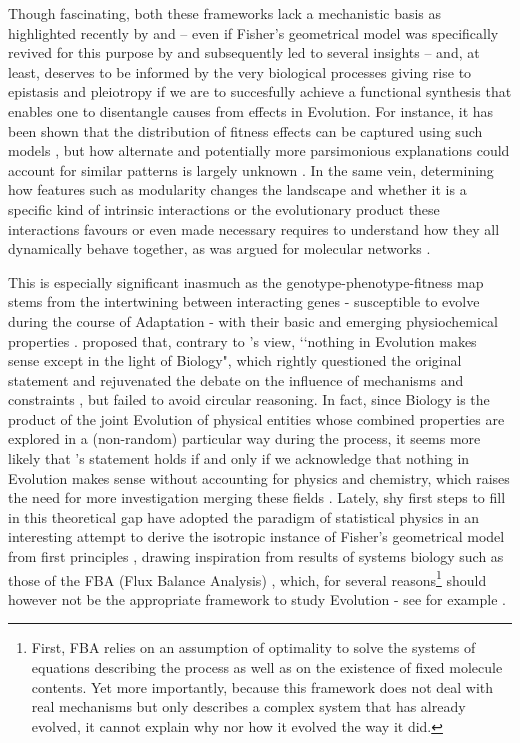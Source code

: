 \documentclass[11pt,onecolumn]{article}
\begin{document}
Though fascinating, both these frameworks lack a mechanistic basis as highlighted recently by \citet{Martin14} and \citet{Yi19} -- even if Fisher's geometrical model was specifically revived for this purpose by \citet{Hartl96} and subsequently led to several insights \citep{Martin06,Martin07} -- and, at least, deserves to be informed by the very biological processes giving rise to epistasis and pleiotropy if we are to succesfully achieve a functional synthesis \citep{Dean07} that enables one to disentangle causes from effects in Evolution. For instance, it has been shown that the distribution of fitness effects can be captured using such models \citep{Martin06,Huber17}, but how alternate and potentially more parsimonious explanations could account for similar patterns is largely unknown \citep{Lourenco11}. In the same vein, determining how features such as modularity \citep{Wagner07,Segre05,Hartwell99} changes the landscape and whether it is a specific kind of intrinsic interactions or the evolutionary product these interactions favours or even made necessary requires to understand how they all dynamically behave together, as was argued for molecular networks \citep{Alexander09}.

This is especially significant inasmuch as the genotype-phenotype-fitness map stems from the intertwining between interacting genes - susceptible to evolve \citep{Gros09} during the course of Adaptation - with their basic and emerging physiochemical properties \citep{Bershtein17}. \citet{Yi19} proposed that, contrary to \citet{Dobzhansky73}'s view, ‘‘nothing in Evolution makes sense except in the light of Biology", which rightly questioned the original statement and rejuvenated the debate on the influence of mechanisms and constraints \citep{Gould79}, but failed to avoid circular reasoning. In fact, since Biology is the product of the joint Evolution of physical entities whose combined properties are explored in a (non-random) particular way \citep{Monod71,Monod74,Wagner12} during the process, it seems more likely that \citet{Dobzhansky73}'s statement holds if and only if we acknowledge that nothing in Evolution makes sense without accounting for physics and chemistry, which raises the need for more investigation merging these fields \citep{Dean07,Serohijos14}. Lately, shy first steps to fill in this theoretical gap have adopted the paradigm of statistical physics in an interesting attempt to derive the isotropic instance of Fisher's geometrical model from first principles \citep{Martin14}, drawing inspiration from results of systems biology such as those of the FBA (Flux Balance Analysis) \citep{Orth10}, which, for several reasons\footnote{First, FBA relies on an assumption of optimality to solve the systems of equations describing the process as well as on the existence of fixed molecule contents. Yet more importantly, because this framework does not deal with real mechanisms but only describes a complex system that has already evolved, it cannot explain why nor how it evolved the way it did.} should however not be the appropriate framework to study Evolution - see for example \cite{Schuster08}.
\end{document}
